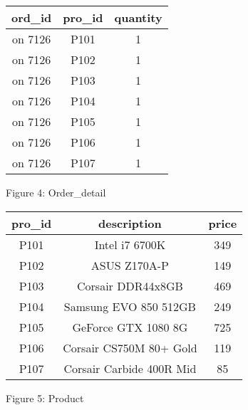 \documentclass{article}
\begin{document}
\bigskip 
\bigskip 
\bigskip 

\begin{center}
    \begin{tabular}{|c|c|c|}
    \hline
    \centering  ord\_id & pro\_id & quantity \\
    \hline
    on 7126 & P101 & 1 \\
    \hline
    on 7126 & P102 & 1 \\
    \hline
    on 7126 & P103 & 1 \\
    \hline
    on 7126 & P104 & 1 \\
    \hline
    on 7126 & P105 & 1 \\
    \hline
    on 7126 & P106 & 1 \\
    \hline
    on 7126 & P107 & 1 \\
    \hline
    \end{tabular}
    \bigskip 
    \newline Figure 4: Order\_detail
\end{center}

\bigskip 
\bigskip 
\bigskip 

\begin{center}
    \begin{tabular}{|c|c|c|}
    \hline
    \centering  pro\_id & description & price \\
    \hline
     P101 & Intel i7 6700K & 349\\
    \hline
     P102 & ASUS Z170A-P & 149 \\
    \hline
     P103 & Corsair DDR44x8GB & 469 \\
    \hline
     P104 & Samsung EVO 850 512GB & 249 \\
    \hline
     P105 & GeForce GTX 1080 8G & 725 \\
    \hline
     P106 & Corsair CS750M 80+ Gold & 119 \\
    \hline
     P107 & Corsair Carbide 400R Mid & 85 \\
    \hline
    \end{tabular}
    \bigskip 
    \newline Figure 5: Product
\end{center}
\end{document}
